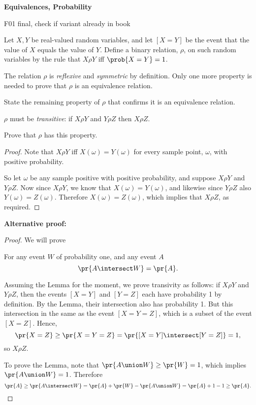 \begin{problem}  \textbf{Equivalences, Probability}
\begin{staffnotes}
F01 final, check if variant already in book
\end{staffnotes}

Let $X,Y$ be real-valued random variables\iffalse defined on the
same sample space \fi, and let $[X=Y]$ be the event that the value of $X$
equals the value of $Y$.  Define a binary relation, $\rho$, on such random
variables by the rule that $X \rho Y$ iff $\prob{X = Y} = 1$.

The relation $\rho$ is \emph{reflexive} and
\emph{symmetric} by definition.  Only one more property is needed to prove that $\rho$
is an equivalence relation.

\bparts

\ppart State the remaining property of $\rho$ that confirms it is an
equivalence relation.

\examspace[0.4in]

\begin{solution}
 $\rho$ must be  \emph{transitive}: if $X \rho Y$ and $Y \rho
Z$ then $X \rho Z$.
\end{solution}

\ppart Prove that $\rho$ has this property.

\examspace[3.0in]

\begin{solution}
\begin{proof}
Note that $X \rho Y$ iff $X(\omega) = Y(\omega)$ for every sample point, $\omega$, with
positive probability.

So let $\omega$ be any sample positive with positive probability, and suppose $X
\rho Y$ and $Y \rho Z$.  Now since $X \rho Y$, we know that $X(\omega) = Y(\omega)$,
and likewise since $Y \rho Z$ also $Y(\omega) = Z(\omega)$.  Therefore $X(\omega) =
Z(\omega)$, which implies that $X \rho Z$, as required.
\end{proof}

\textbf{Alternative proof:}
\begin{proof}
We will prove
\begin{lemma*}
For any event $W$ of probability one, and any event $A$
\[
\pr{A \intersect W} = \pr{A}.
\]
\end{lemma*}

Assuming the Lemma for the moment, we prove transivity as follows: if
$X\rho Y$ and $Y \rho Z$, then the events $[X=Y]$ and $[Y=Z]$ each have
probability 1 by definition.  By the Lemma, their intersection also has
probability 1.  But this intersection in the same as the event $[X = Y =
Z]$, which is a subset of the event $[X=Z]$.  Hence,
\[
\pr{X=Z} \geq \pr{X=Y=Z} = \pr{[X=Y] \intersect [Y=Z]} = 1,
\]
so $X\rho Z$.

To prove the Lemma, note that $\pr{A \union W} \geq \pr{W} = 1$,
which implies $\pr{A \union W}=1$.  Therefore
\[
\pr{A} \geq \pr{A \intersect W} = \pr{A} + \pr{W} - \pr{A \union W} = 
\pr{A} + 1 - 1 \geq \pr{A}.
\]
\end{proof}
\end{solution}

\eparts
\end{problem}

